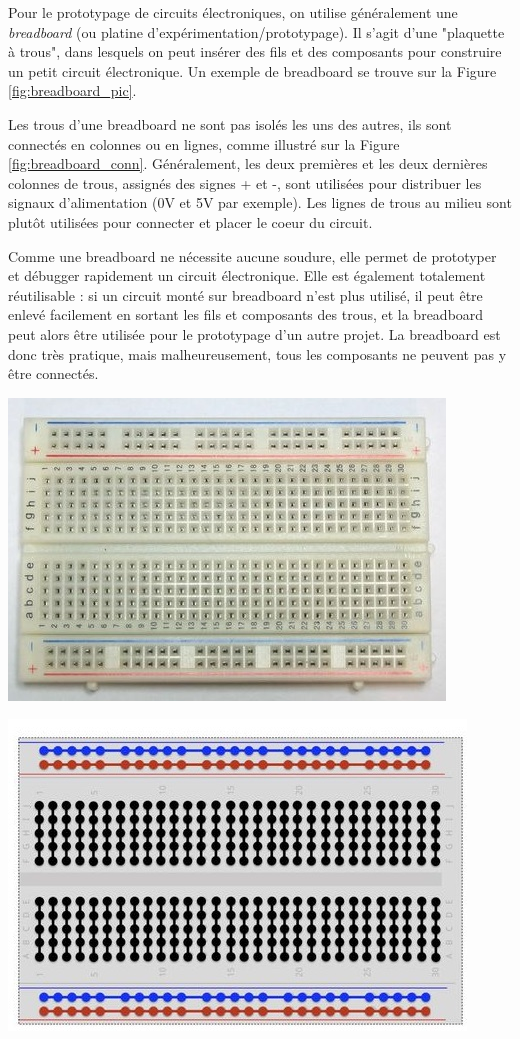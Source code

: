 
Pour le prototypage de circuits électroniques, on utilise généralement une \emph{breadboard} (ou platine d'expérimentation/prototypage). Il s'agit d'une "plaquette à trous", dans lesquels on peut insérer des fils et des composants pour construire un petit circuit électronique. Un exemple de breadboard se trouve sur la Figure \ref{fig:breadboard_pic}.

Les trous d'une breadboard ne sont pas isolés les uns des autres, ils sont connectés en colonnes ou en lignes, comme illustré sur la Figure \ref{fig:breadboard_conn}. Généralement, les deux premières et les deux dernières colonnes de trous, assignés des signes + et -, sont utilisées pour distribuer les signaux d'alimentation (0V et 5V par exemple). Les lignes de trous au milieu sont plutôt utilisées pour connecter et placer le coeur du circuit.

Comme une breadboard ne nécessite aucune soudure, elle permet de prototyper et débugger rapidement un circuit électronique. Elle est également totalement réutilisable : si un circuit monté sur breadboard n'est plus utilisé, il peut être enlevé facilement en sortant les fils et composants des trous, et la breadboard peut alors être utilisée pour le prototypage d'un autre projet. La breadboard est donc très pratique, mais malheureusement, tous les composants ne peuvent pas y être connectés.\\

\begin{minipage}[t]{.49\textwidth}
	\centering
	\includegraphics[width=.6\textwidth,angle=90]{figures/breadboard_picture.jpg}
	\label{fig:breadboard_pic}
\end{minipage}
\hfill
\begin{minipage}[t]{.49\textwidth}
	\centering
	\includegraphics[width=.6\textwidth,angle=90]{figures/breadboard_connections.jpg}
	\label{fig:breadboard_conn}
\end{minipage}
\vspace{1cm}